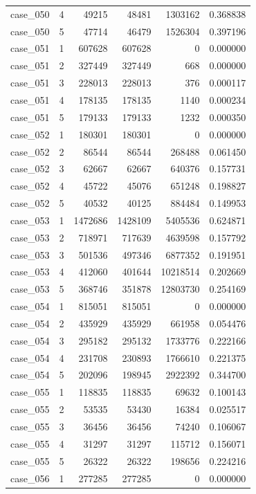 \begin{longtable}{lrrrrr}
case\_050 & 4 & 49215 & 48481 & 1303162 & 0.368838 \\
case\_050 & 5 & 47714 & 46479 & 1526304 & 0.397196 \\
case\_051 & 1 & 607628 & 607628 & 0 & 0.000000 \\
case\_051 & 2 & 327449 & 327449 & 668 & 0.000000 \\
case\_051 & 3 & 228013 & 228013 & 376 & 0.000117 \\
case\_051 & 4 & 178135 & 178135 & 1140 & 0.000234 \\
case\_051 & 5 & 179133 & 179133 & 1232 & 0.000350 \\
case\_052 & 1 & 180301 & 180301 & 0 & 0.000000 \\
case\_052 & 2 & 86544 & 86544 & 268488 & 0.061450 \\
case\_052 & 3 & 62667 & 62667 & 640376 & 0.157731 \\
case\_052 & 4 & 45722 & 45076 & 651248 & 0.198827 \\
case\_052 & 5 & 40532 & 40125 & 884484 & 0.149953 \\
case\_053 & 1 & 1472686 & 1428109 & 5405536 & 0.624871 \\
case\_053 & 2 & 718971 & 717639 & 4639598 & 0.157792 \\
case\_053 & 3 & 501536 & 497346 & 6877352 & 0.191951 \\
case\_053 & 4 & 412060 & 401644 & 10218514 & 0.202669 \\
case\_053 & 5 & 368746 & 351878 & 12803730 & 0.254169 \\
case\_054 & 1 & 815051 & 815051 & 0 & 0.000000 \\
case\_054 & 2 & 435929 & 435929 & 661958 & 0.054476 \\
case\_054 & 3 & 295182 & 295132 & 1733776 & 0.222166 \\
case\_054 & 4 & 231708 & 230893 & 1766610 & 0.221375 \\
case\_054 & 5 & 202096 & 198945 & 2922392 & 0.344700 \\
case\_055 & 1 & 118835 & 118835 & 69632 & 0.100143 \\
case\_055 & 2 & 53535 & 53430 & 16384 & 0.025517 \\
case\_055 & 3 & 36456 & 36456 & 74240 & 0.106067 \\
case\_055 & 4 & 31297 & 31297 & 115712 & 0.156071 \\
case\_055 & 5 & 26322 & 26322 & 198656 & 0.224216 \\
case\_056 & 1 & 277285 & 277285 & 0 & 0.000000 \\

\end{longtable}
